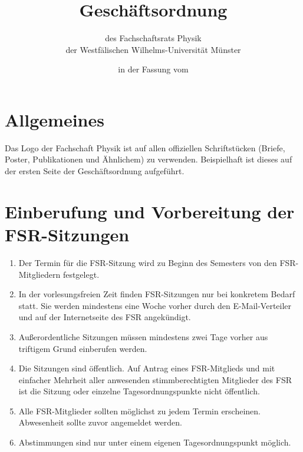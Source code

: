 \documentclass[
	a4paper,
	12pt,
	oneside,
	parskip=half-,
	pagesize,
	headsepline,
	german,
	ngerman
]{scrartcl}
\title{Geschäftsordnung}
\subtitle{des Fachschaftsrats Physik\\
der Westfälischen Wilhelms-Universität Münster}
\date{in der Fassung vom \formatdate{13}{01}{2016}}
\author{}
\begin{document}
\maketitle

\section{Allgemeines}
Das Logo der Fachschaft Physik ist auf allen offiziellen Schriftstücken (Briefe, Poster, Publikationen und Ähnlichem) zu verwenden. Beispielhaft ist dieses auf der ersten Seite der Geschäftsordnung aufgeführt.


\section{Einberufung und Vorbereitung der FSR-Sitzungen}
\begin{enumerate}
	\item Der Termin für die FSR-Sitzung wird zu Beginn des Semesters von den FSR-Mitgliedern festgelegt.
	\item In der vorlesungsfreien Zeit finden FSR-Sitzungen nur bei konkretem Bedarf statt. Sie werden mindestens eine Woche vorher durch den E-Mail-Verteiler und auf der Internetseite des FSR angekündigt.
	\item Außerordentliche Sitzungen müssen mindestens zwei Tage vorher aus triftigem Grund einberufen werden. 
	\item Die Sitzungen sind öffentlich. Auf Antrag eines FSR-Mitglieds und mit einfacher Mehrheit aller anwesenden stimmberechtigten Mitglieder des FSR ist die Sitzung oder einzelne Tagesordnungspunkte nicht öffentlich.
	\item Alle FSR-Mitglieder sollten möglichst zu jedem Termin erscheinen. Abwesenheit sollte zuvor angemeldet werden.
	\item Abstimmungen sind nur unter einem eigenen Tagesordnungspunkt möglich.
\end{enumerate}
\end{document}
